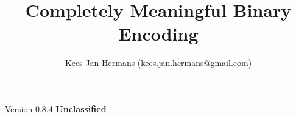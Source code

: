 \documentclass[twoside,a4paper]{refart}
\title{Completely Meaningful Binary Encoding}
\begin{document}
\maketitle

\begin{flushright}
\author{Kees-Jan Hermans (kees.jan.hermans@gmail.com)}
\date{}
\end{flushright}



\vfill
\begin{flushright}
Version 0.8.4
\textbf{Unclassified}

\end{flushright}

\newpage
\tableofcontents

\raggedbottom

\newpage




\printindex
\end{document}
